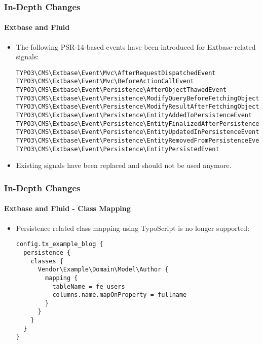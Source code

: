
\begin{frame}[fragile]
	\frametitle{In-Depth Changes}
	\framesubtitle{Extbase and Fluid}

	\lstset{basicstyle=\tiny\ttfamily}

	\begin{itemize}
		\item The following PSR-14-based events have been introduced for Extbase-related signals:
\begin{lstlisting}
TYPO3\CMS\Extbase\Event\Mvc\AfterRequestDispatchedEvent
TYPO3\CMS\Extbase\Event\Mvc\BeforeActionCallEvent
TYPO3\CMS\Extbase\Event\Persistence\AfterObjectThawedEvent
TYPO3\CMS\Extbase\Event\Persistence\ModifyQueryBeforeFetchingObjectDataEvent
TYPO3\CMS\Extbase\Event\Persistence\ModifyResultAfterFetchingObjectDataEvent
TYPO3\CMS\Extbase\Event\Persistence\EntityAddedToPersistenceEvent
TYPO3\CMS\Extbase\Event\Persistence\EntityFinalizedAfterPersistenceEvent
TYPO3\CMS\Extbase\Event\Persistence\EntityUpdatedInPersistenceEvent
TYPO3\CMS\Extbase\Event\Persistence\EntityRemovedFromPersistenceEvent
TYPO3\CMS\Extbase\Event\Persistence\EntityPersistedEvent
\end{lstlisting}

		\item Existing signals have been replaced and should not be used anymore.

	\end{itemize}

\end{frame}


\begin{frame}[fragile]
	\frametitle{In-Depth Changes}
	\framesubtitle{Extbase and Fluid - Class Mapping}

	\lstset{basicstyle=\tiny\ttfamily}

	\begin{itemize}
		\item Persistence related class mapping using TypoScript is no longer supported:
\begin{lstlisting}
config.tx_example_blog {
  persistence {
    classes {
      Vendor\Example\Domain\Model\Author {
        mapping {
          tableName = fe_users
          columns.name.mapOnProperty = fullname
        }
      }
    }
  }
}
\end{lstlisting}

	\end{itemize}

\end{frame}

